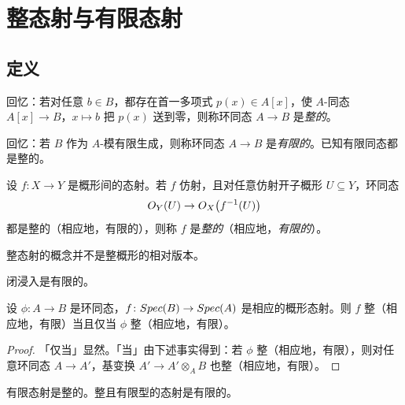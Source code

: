 
\section{整态射与有限态射}\label{sec:30}

\subsection{定义}\label{sec:30.1}

回忆：若对任意 $b\in B$，都存在首一多项式 $p(x)\in A[x]$，使 $A$-同态 $A[x]\to B$，$x\mapsto b$ 把 $p(x)$ 送到零，则称环同态 $A\to B$ 是\emph{整的}。

回忆：若 $B$ 作为 $A$-模有限生成，则称环同态 $A\to B$ 是\emph{有限的}。已知有限同态都是整的。

\begin{definition}\label{def:30.1.1}
设 $f\colon X\to Y$ 是概形间的态射。若 $f$ 仿射，且对任意仿射开子概形 $U\subseteq Y$，环同态
\[
O_Y(U)\to O_X\bigl(f^{-1}(U)\bigr)
\]
都是整的（相应地，有限的），则称 $f$ 是\emph{整的}（相应地，\emph{有限的}）。
\end{definition}

\begin{warning}\label{warn:30.1.2}
整态射的概念并不是整概形的相对版本。
\end{warning}

\begin{example}\label{ex:30.1.3}
闭浸入是有限的。
\end{example}

\begin{lemma}\label{lem:30.1.4}
设 $\phi\colon A\to B$ 是环同态，$f\colon Spec(B)\to Spec(A)$ 是相应的概形态射。则 $f$ 整（相应地，有限）当且仅当 $\phi$ 整（相应地，有限）。
\end{lemma}

\begin{proof}
「仅当」显然。「当」由下述事实得到：若 $\phi$ 整（相应地，有限），则对任意环同态 $A\to A'$，基变换 $A'\to A'\otimes_AB$ 也整（相应地，有限）。
\end{proof}

\begin{lemma}\label{lem:30.1.5}
有限态射是整的。整且有限型的态射是有限的。
\end{lemma}


